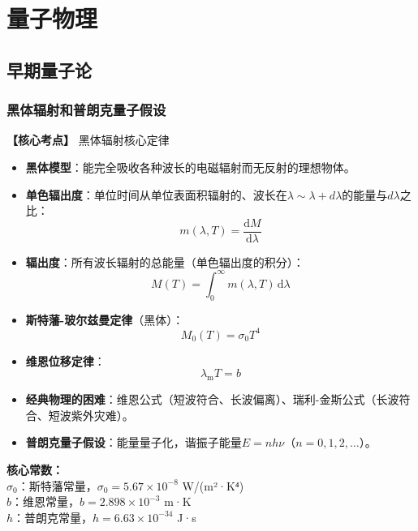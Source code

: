 
\section{量子物理}

\subsection{早期量子论}

\subsubsection{黑体辐射和普朗克量子假设}
\textbf{【核心考点】} 黑体辐射核心定律 \par\vspace{0.3em}
\begin{itemize}
    \item \textbf{黑体模型}：能完全吸收各种波长的电磁辐射而无反射的理想物体。
    \item \textbf{单色辐出度}：单位时间从单位表面积辐射的、波长在$\lambda\sim\lambda+d\lambda$的能量与$d\lambda$之比：
          \[
          m(\lambda, T) = \frac{\mathrm{d}M}{\mathrm{d}\lambda}
          \]
    \item \textbf{辐出度}：所有波长辐射的总能量（单色辐出度的积分）：
          \[
          M(T) = \int_{0}^{\infty} m(\lambda, T) \, \mathrm{d}\lambda
          \]
    \item \textbf{斯特藩-玻尔兹曼定律}（黑体）：
          \[
          M_0(T) = \sigma_0 T^4
          \]
    \item \textbf{维恩位移定律}：
          \[
          \lambda_{\text{m}}T = b
          \]
    \item \textbf{经典物理的困难}：维恩公式（短波符合、长波偏离）、瑞利-金斯公式（长波符合、短波紫外灾难）。
    \item \textbf{普朗克量子假设}：能量量子化，谐振子能量$E = nh\nu$（$n=0,1,2,\dots$）。
\end{itemize}

\textbf{核心常数：}\\
$\sigma_0$：斯特藩常量，$\sigma_0=5.67\times10^{-8}$ W/(m²·K⁴) \\
$b$：维恩常量，$b=2.898\times10^{-3}$ m·K \\
$h$：普朗克常量，$h=6.63\times10^{-34}$ J·s
\vspace{0.5em}

